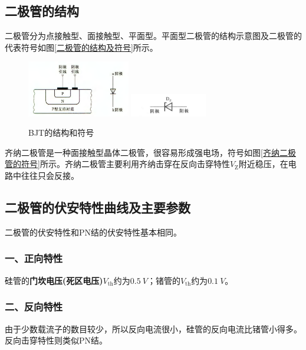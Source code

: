 \subsection{二极管的结构}
二极管分为点接触型、面接触型、平面型。平面型二极管的结构示意图及二极管的代表符号如图\ref{二极管的结构及符号}所示。

\begin{figure}[htb]
    \centering
        {\includegraphics[width=0.4\textwidth]{pic/半导体二极管的结构及符号.png}}\qquad
        {\includegraphics[width=0.3\textwidth]{pic/齐纳二极管的符号.png}}
        \caption{BJT的结构和符号\label{111}}
\end{figure}

齐纳二极管是一种面接触型晶体二极管，很容易形成强电场，符号如图\ref{齐纳二极管的符号}所示。齐纳二极管主要利用齐纳击穿在反向击穿特性$V_{\mathrm{Z}}$附近稳压，在电路中往往只会反接。

\subsection{二极管的伏安特性曲线及主要参数}

二极管的伏安特性和PN结的伏安特性基本相同。

\subsubsection{一、正向特性}

硅管的\textbf{门坎电压(死区电压)}$V_{\mathrm{th}}$约为$\qty{0.5}{V}$；锗管的$V_{\mathrm{th}}$约为$\qty{0.1}{V}$。

\subsubsection{二、反向特性}
由于少数载流子的数目较少，所以反向电流很小，硅管的反向电流比锗管小得多。反向击穿特性则类似PN结。

